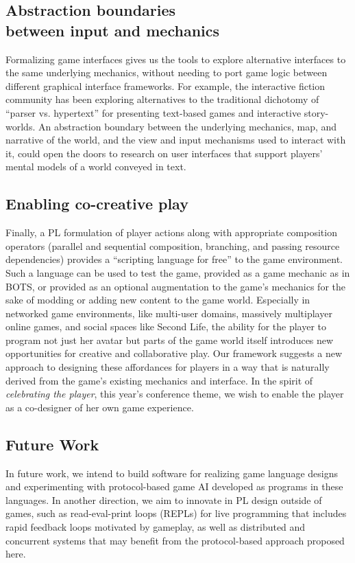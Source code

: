 \subsection{Abstraction boundaries \\ between input and mechanics}


Formalizing game interfaces gives us the tools to explore alternative
interfaces to the same underlying mechanics, without needing to port
game logic between different graphical interface frameworks. For example,
the interactive fiction community has been exploring alternatives to the
traditional dichotomy of ``parser vs. hypertext'' for presenting
text-based games and interactive story-worlds. An abstraction boundary
between the underlying mechanics, map, and narrative of the world, and the
view and input mechanisms used to interact with it, could open the doors to
research on user interfaces that support players' mental models of a world
conveyed in text.

\subsection{Enabling co-creative play}

Finally, a PL formulation of player actions along with appropriate
composition operators (parallel and sequential composition, branching, and
passing resource dependencies) provides a ``scripting language for free''
to the game environment. 
Such a language can be used to test the game, provided as a game mechanic
as in BOTS, or provided as an optional augmentation to the game's mechanics
for the sake of modding or adding new content to the game world. Especially
in networked game environments, like multi-user domains, massively
multiplayer online games, and social spaces like Second Life, the ability
for the player to program not just her avatar but parts of the game world
itself introduces new opportunities for creative and collaborative play.
Our framework suggests a new approach to designing these affordances for
players in a way that is naturally derived from the game's existing
mechanics and interface.  In the spirit of {\em celebrating the player},
this year's conference theme, we wish to enable the player as a
co-designer of her own game experience.


\subsection{Future Work}
  In future work, we intend to build software for realizing game language
  designs and experimenting with protocol-based game AI developed as
  programs in these languages. In another direction, we aim to innovate in
  PL design outside of games, such as read-eval-print loops (REPLs) for
  live programming that includes rapid feedback loops motivated by
  gameplay, as well as distributed and concurrent systems that may benefit
  from the protocol-based approach proposed here.


